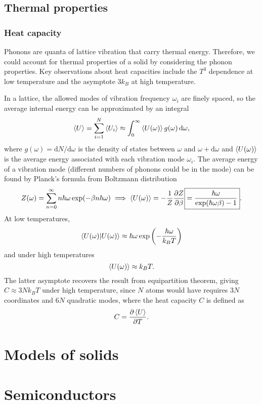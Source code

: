 \documentclass{article}
\theoremstyle{nonumberplain}
\begin{document}
\subsection{Thermal properties}
\subsubsection{Heat capacity}
Phonons are quanta of lattice vibration that carry thermal energy. Therefore, we could account for thermal properties of a solid by considering the phonon properties. Key observations about heat capacities include the $T^3$ dependence at low temperature and the asymptote $3 k_B$ at high temperature. 

In a lattice, the allowed modes of vibration frequency $\omega_i$ are finely spaced, so the average internal energy can be approximated by an integral
\[
    \expval{U} = \sum_{i=1}^{N} \expval{U_i} \approx \int_{0}^{\infty} \expval{U(\omega)} g(\omega) \,\mathrm{d}\omega, 
\]
where $g(\omega) = \mathrm{d} N / \mathrm{d} \omega $ is the density of states between $\omega$ and $\omega + \mathrm{d} \omega$ and $\expval{U(\omega)}$ is the average energy associated with each vibration mode $\omega_i$. The average energy of a vibration mode (different numbers of phonons could be in the mode) can be found by Planck's formula from Boltzmann distribution
\[
    Z(\omega ) = \sum_{n=0}^{\infty} n \hbar \omega \exp(-\beta n \hbar \omega) \implies  \expval{U(\omega )} = -\frac{1}{Z }\frac{\partial Z}{\partial \beta } \boxed{= \frac{\hbar \omega}{\exp(\hbar \omega \beta ) - 1}}. 
\]
At low temperatures, 
\[
    \braket{U(\omega )} \approx \hbar \omega \exp \left( -\frac{\hbar \omega }{k_B T}\right)
\]
and under high temperatures
\[
    \expval{U(\omega )} \approx k_B T.
\]
The latter asymptote recovers the result from equipartition theorem, giving $C \approx 3 N k_B T$ under high temperature, since $N$ atoms would have requires $3N$ coordinates and $6N$ quadratic modes, where the heat capacity $C$ is defined as
\[
    C = \frac{\partial \expval{U}}{\partial T}. 
\] 
\section{Models of solids}
\section{Semiconductors}
\end{document}
